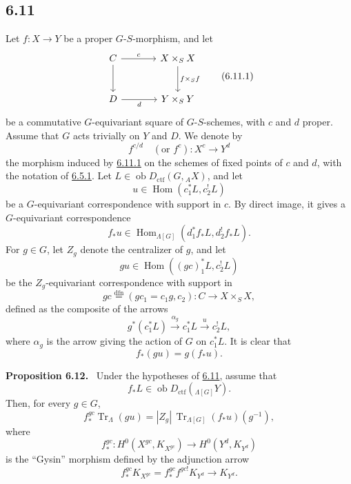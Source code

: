 \documentclass[11pt]{article}
\newenvironment{statement}[1]{\par\medskip\noindent\textbf{#1.}\ }{\par\medskip}
\DeclareMathOperator{\Hom}{Hom}
\providecommand{\Tr}{\operatorname{Tr}}
\providecommand{\Tr}{\operatorname{Tr}}
\providecommand{\Ob}{\operatorname{ob}}
\providecommand{\Tr}{\operatorname{Tr}}
\providecommand{\Hom}{\operatorname{Hom}}
\providecommand{\Ob}{\operatorname{ob}}
\providecommand{\Tr}{\operatorname{Tr}}
\providecommand{\Ob}{\operatorname{Ob}}
\providecommand{\Hom}{\operatorname{Hom}}
\providecommand{\Tr}{\operatorname{Tr}}
\providecommand{\Ob}{\operatorname{ob}}
\providecommand{\Ob}{\operatorname{Ob}}
\begin{document}
\subsection*{6.11}\label{sga5:IIIB:subsection:6.11}
Let $f:X\to Y$ be a proper $G$-$S$-morphism, and let
\begin{equation}
\begin{tikzcd}[column sep=large,row sep=large]
C \arrow[r,"c"] \arrow[d] & X\times_SX \arrow[d,"f\times_Sf"]\\
D \arrow[r,"d"'] & Y\times_SY
\end{tikzcd}
\tag{6.11.1}\label{sga5:IIIB:equation:6.11.1}
\end{equation}
be a commutative $G$-equivariant square of $G$-$S$-schemes, with $c$ and $d$ proper. Assume that $G$ acts trivially on $Y$ and $D$. We denote by
\begin{equation}
f^{c/d}\quad(\text{or } f^c):X^c\longrightarrow Y^d
\tag{6.11.2}\label{sga5:IIIB:equation:6.11.2}
\end{equation}
the morphism induced by \hyperref[sga5:IIIB:equation:6.11.1]{6.11.1} on the schemes of fixed points of $c$ and $d$, with the notation of \hyperref[sga5:IIIB:equation:6.5.1]{6.5.1}. Let $L\in\Ob D_{\mathrm{ctf}}(G,{}_AX)$, and let
\[
u\in\Hom(c_1^*L,c_2^!L)
\]
be a $G$-equivariant correspondence with support in $c$. By direct image, it gives a $G$-equivariant correspondence
\[
f_*u\in\Hom_{\Lambda[G]}(d_1^*f_*L,d_2^!f_*L).
\]
For $g\in G$, let $Z_g$ denote the centralizer of $g$, and let
\begin{equation}
gu\in\Hom((gc)_1^*L,c_2^!L)
\tag{6.11.3}\label{sga5:IIIB:equation:6.11.3}
\end{equation}
be the $Z_g$-equivariant correspondence with support in
\begin{equation}
gc\stackrel{\mathrm{dfn}}{=}(gc_1=c_1g,c_2):C\to X\times_SX,
\tag{6.11.4}\label{sga5:IIIB:equation:6.11.4}
\end{equation}
defined as the composite of the arrows
\[
g^*(c_1^*L)\xrightarrow{\alpha_g}c_1^*L\xrightarrow{u}c_2^!L,
\]
where $\alpha_g$ is the arrow giving the action of $G$ on $c_1^*L$. It is clear that
\begin{equation}
f_*(gu)=g(f_*u).
\tag{6.11.5}\label{sga5:IIIB:equation:6.11.5}
\end{equation}

\label{sga5:IIIB:proposition:6.12}\begin{statement}{Proposition 6.12}
Under the hypotheses of \hyperref[sga5:IIIB:subsection:6.11]{6.11}, assume that
\[
f_*L\in\Ob D_{\mathrm{ctf}}({}_{\Lambda[G]}Y).
\]
Then, for every $g\in G$,
\begin{equation}
f_*^{gc}\Tr_{\Lambda}(gu)
=
|Z_g|\,\Tr_{\Lambda[G]}(f_*u)(g^{-1}),
\tag{6.12.1}\label{sga5:IIIB:equation:6.12.1}
\end{equation}
where
\[
f_*^{gc}:H^0(X^{gc},K_{X^{gc}})\longrightarrow H^0(Y^d,K_{Y^d})
\]
is the ``Gysin'' morphism defined by the adjunction arrow
\[
f_*^{gc}K_{X^{gc}}=f_*^{gc}f^{gc!}K_{Y^d}\longrightarrow K_{Y^d}.
\]
\end{statement}
\end{document}

